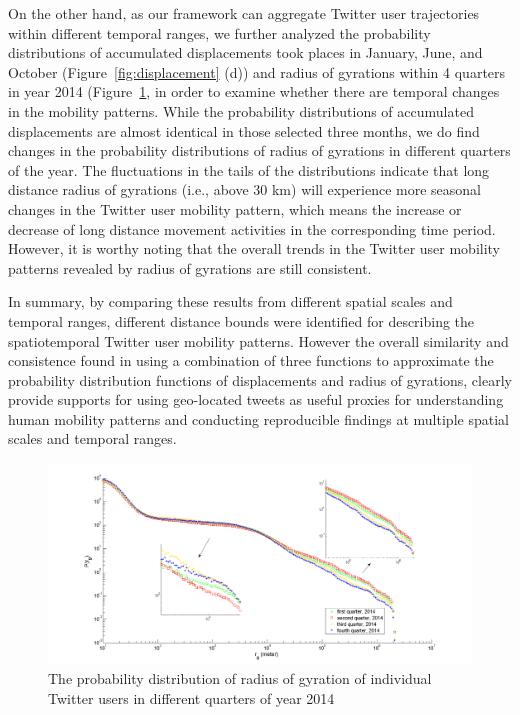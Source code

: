 \documentclass[ijgi,article,submit,moreauthors,pdftex,10pt,a4paper]{mdpi}
\theoremstyle{mdpi}
\newcounter{ex}
\newcounter{re}
\theoremstyle{mdpidefinition}
\begin{document}
On the other hand, as our framework can aggregate Twitter user trajectories within different temporal ranges, we further analyzed the probability distributions of accumulated displacements took places in January, June, and October (Figure~\ref{fig:displacement} (d)) and radius of gyrations within 4 quarters in year 2014 (Figure~\ref{fig:gyration_season}, in order to examine whether there are temporal changes in the mobility patterns.
While the probability distributions of accumulated displacements are almost identical in those selected three months,  we do find changes in the probability distributions of radius of gyrations in different quarters of the year. 
The fluctuations in the tails of the distributions indicate that long distance radius of gyrations (i.e., above 30 km) will experience more seasonal changes in the Twitter user mobility pattern, which means the increase or decrease of long distance movement activities in the corresponding time period. 
However, it is worthy noting that the overall trends in the Twitter user mobility patterns revealed by radius of gyrations are still consistent.

In summary, by comparing these results from different spatial scales and temporal ranges, different distance bounds were identified for describing the spatiotemporal Twitter user mobility patterns.
However the overall similarity and consistence found in using a combination of three functions to approximate the probability distribution functions of displacements and radius of gyrations, clearly provide supports for using geo-located tweets as useful proxies for understanding human mobility patterns and conducting reproducible findings at multiple spatial scales and temporal ranges.
 
\begin{figure}[ht]
\centering
\includegraphics[width=1.0\linewidth]{./figures/gyration_season}
\caption{The probability distribution of radius of gyration of individual Twitter users in different quarters of year 2014}
\label{fig:gyration_season}
\end{figure}
\FloatBarrier
\end{document}
